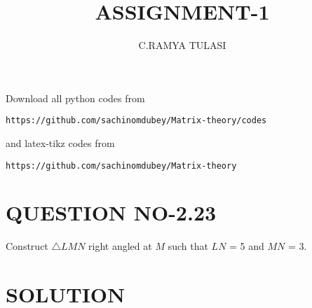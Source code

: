 \documentclass[journal,12pt,twocolumn]{IEEEtran}
\begin{document}
\renewcommand{\thefigure}{\theproblem}

\def\putbox#1#2#3{\makebox[0in][l]{\makebox[#1][l]{}\raisebox{\baselineskip}[0in][0in]{\raisebox{#2}[0in][0in]{#3}}}}
     \def\rightbox#1{\makebox[0in][r]{#1}}
     \def\centbox#1{\makebox[0in]{#1}}
     \def\topbox#1{\raisebox{-\baselineskip}[0in][0in]{#1}}
     \def\midbox#1{\raisebox{-0.5\baselineskip}[0in][0in]{#1}}
\vspace{3cm}
\title{ASSIGNMENT-1}
\author{C.RAMYA TULASI}

\maketitle
\newpage

\bigskip
\renewcommand{\thefigure}{\theenumi}
\renewcommand{\thetable}{\theenumi}
Download all python codes from 
\begin{lstlisting}
https://github.com/sachinomdubey/Matrix-theory/codes
\end{lstlisting}
%
and latex-tikz codes from 
%
\begin{lstlisting}
https://github.com/sachinomdubey/Matrix-theory
\end{lstlisting}
%
\section{QUESTION NO-2.23}
\item Construct $\triangle LMN$  right angled at $M$ such that
$LN$ = 5 and $MN$ = 3.
%

%
\section{SOLUTION}
 
\end{document}
